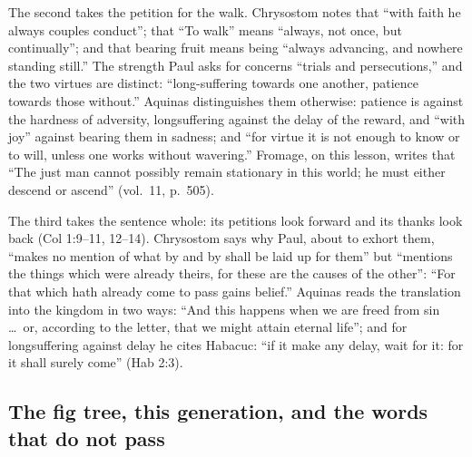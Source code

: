 The second takes the petition for the walk. Chrysostom notes that ``with
faith he always couples conduct''; that ``To walk'' means ``always, not once,
but continually''; and that bearing fruit means being ``always advancing, and
nowhere standing still.'' The strength Paul asks for concerns ``trials and
persecutions,'' and the two virtues are distinct: ``long-suffering towards
one another, patience towards those without.'' Aquinas distinguishes them
otherwise: patience is against the hardness of adversity, longsuffering
against the delay of the reward, and ``with joy'' against bearing them in
sadness; and ``for virtue it is not enough to know or to will, unless one
works without wavering.'' Fromage, on this lesson, writes that ``The just man
cannot possibly remain stationary in this world; he must either descend or
ascend'' (vol.~11, p.~505).

The third takes the sentence whole: its petitions look forward and its thanks
look back (Col 1:9--11, 12--14). Chrysostom says why Paul, about to exhort
them, ``makes no mention of what by and by shall be laid up for them'' but ``mentions the
things which were already theirs, for these are the causes of the other'':
``For that which hath already come to pass gains belief.'' Aquinas reads the
translation into the kingdom in two ways: ``And this happens when we are
freed from sin \dots\ or, according to the letter, that we might attain
eternal life''; and for longsuffering against delay he cites Habacuc: ``if
it make any delay, wait for it: for it shall surely come'' (Hab 2:3).

\subsection{The fig tree, this generation, and the words that do not pass}

